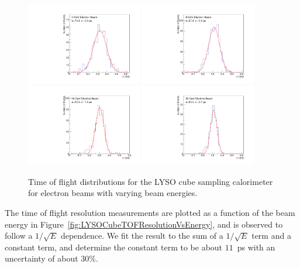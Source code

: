 \documentclass[11pt]{article}
\begin{document}
\begin{figure}[h] \centering
\includegraphics[width=0.45\textwidth]{figs/TOF_Electron_LYSOCube_4GeV} 
\includegraphics[width=0.45\textwidth]{figs/TOF_Electron_LYSOCube_8GeV} 
\includegraphics[width=0.45\textwidth]{figs/TOF_Electron_LYSOCube_16GeV} 
\includegraphics[width=0.45\textwidth]{figs/TOF_Electron_LYSOCube_32GeV} 
\caption{ Time of flight distributions for the LYSO cube sampling calorimeter
for electron beams with varying beam energies. } 
\label{fig:LYSOCubeTOF}
\end{figure}

The time of flight resolution measurements are plotted as a function of the
beam energy in Figure~\ref{fig:LYSOCubeTOFResolutionVsEnergy}, and is observed
to follow a $1/\sqrt{E}$ dependence. We fit the result to the sum of a 
$1/\sqrt{E}$ term and a constant term, and determine the constant term to
be about $11$~ps with an uncertainty of about $30\%$. 
\end{document}
